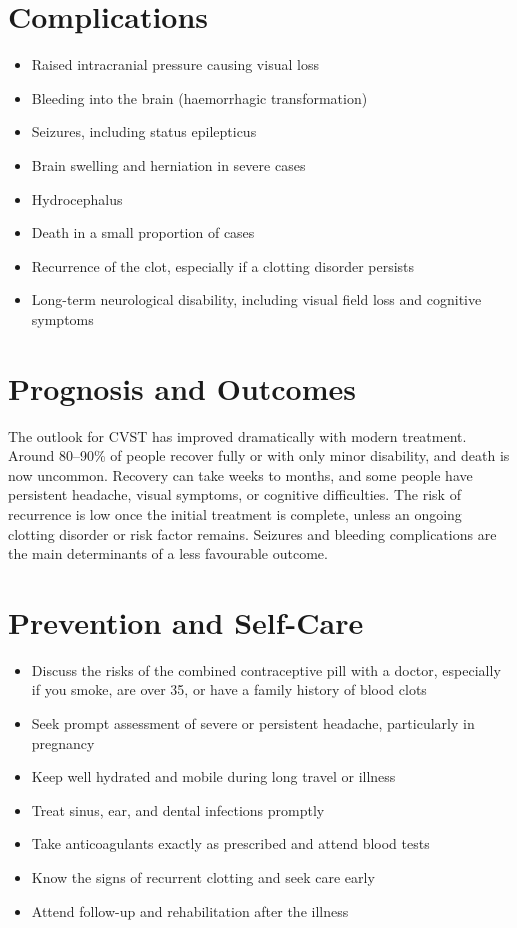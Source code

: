 \section*{Complications}
\begin{itemize}
    \item Raised intracranial pressure causing visual loss
    \item Bleeding into the brain (haemorrhagic transformation)
    \item Seizures, including status epilepticus
    \item Brain swelling and herniation in severe cases
    \item Hydrocephalus
    \item Death in a small proportion of cases
    \item Recurrence of the clot, especially if a clotting disorder persists
    \item Long-term neurological disability, including visual field loss and cognitive symptoms
\end{itemize}

\section*{Prognosis and Outcomes}
The outlook for CVST has improved dramatically with modern treatment. Around 80--90\% of people recover fully or with only minor disability, and death is now uncommon. Recovery can take weeks to months, and some people have persistent headache, visual symptoms, or cognitive difficulties. The risk of recurrence is low once the initial treatment is complete, unless an ongoing clotting disorder or risk factor remains. Seizures and bleeding complications are the main determinants of a less favourable outcome.

\section*{Prevention and Self-Care}
\begin{itemize}
    \item Discuss the risks of the combined contraceptive pill with a doctor, especially if you smoke, are over 35, or have a family history of blood clots
    \item Seek prompt assessment of severe or persistent headache, particularly in pregnancy
    \item Keep well hydrated and mobile during long travel or illness
    \item Treat sinus, ear, and dental infections promptly
    \item Take anticoagulants exactly as prescribed and attend blood tests
    \item Know the signs of recurrent clotting and seek care early
    \item Attend follow-up and rehabilitation after the illness
\end{itemize}

